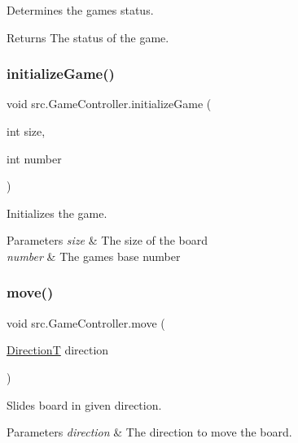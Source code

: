 Determines the game\textquotesingle{}s status. 

\begin{DoxyReturn}{Returns}
The status of the game. 
\end{DoxyReturn}
\mbox{\label{classsrc_1_1GameController_a08f904aaa7bd33a394efa613f1381f34}} 
\subsubsection{\texorpdfstring{initialize\+Game()}{initializeGame()}}
{\footnotesize\ttfamily void src.\+Game\+Controller.\+initialize\+Game (\begin{DoxyParamCaption}\item[{int}]{size,  }\item[{int}]{number }\end{DoxyParamCaption})}



Initializes the game. 


\begin{DoxyParams}{Parameters}
{\em size} & The size of the board \\
\hline
{\em number} & The game\textquotesingle{}s base number \\
\hline
\end{DoxyParams}
\mbox{\label{classsrc_1_1GameController_a077ce144db0723f692c64245fb0afbab}} 
\subsubsection{\texorpdfstring{move()}{move()}}
{\footnotesize\ttfamily void src.\+Game\+Controller.\+move (\begin{DoxyParamCaption}\item[{\hyperlink{enumsrc_1_1DirectionT}{DirectionT}}]{direction }\end{DoxyParamCaption})}



Slides board in given direction. 


\begin{DoxyParams}{Parameters}
{\em direction} & The direction to move the board. \\
\hline
\end{DoxyParams}
\mbox{\label{classsrc_1_1GameController_a20d10d112b3e30132c8b8594f2ceb6dd}} 

